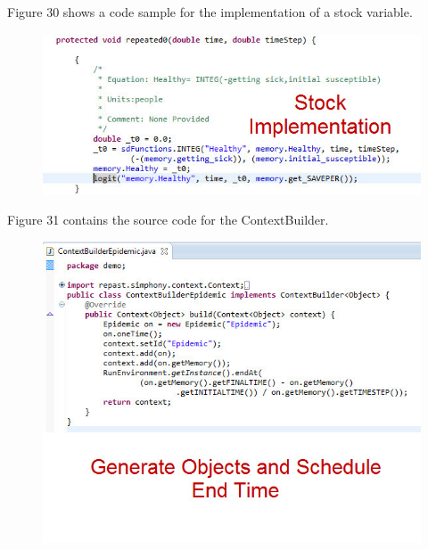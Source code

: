 \documentclass[11pt]{amsart}
\begin{document}
Figure 30 shows a code sample for the implementation of a stock variable.

\begin{figure}[ht]
\begin{center}
\vspace{.2in}
\centerline {
\includegraphics[totalheight=0.3\textheight]{images/030.jpg}
}
\caption{}
\label{fig:030}
\end{center}
\end{figure}

Figure 31 contains the source code for the ContextBuilder.

\begin{figure}[ht]
\begin{center}
\vspace{.2in}
\centerline {
\includegraphics[totalheight=0.3\textheight]{images/031.jpg}
}
\caption{}
\label{fig:031}
\end{center}
\end{figure}
\end{document}
